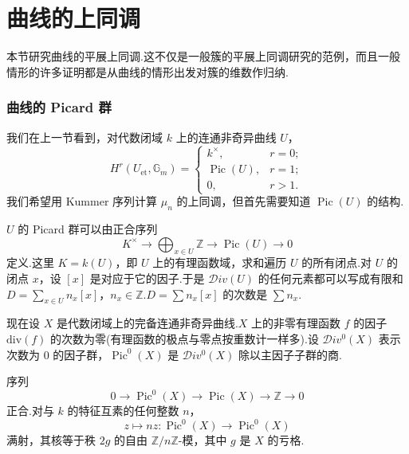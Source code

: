 ﻿%
\chapter{曲线的上同调}\label{sec:14}

本节研究曲线的平展上同调.这不仅是一般簇的平展上同调研究的范例，而且一般情形的许多证明都是从曲线的情形出发对簇的维数作归纳.

\subsection*{曲线的 Picard 群}

我们在上一节看到，对代数闭域 $k$ 上的连通非奇异曲线 $U$，
\[
H^{r}(U_{\mathrm{et}}, \mathbb{G}_{m}) = \begin{cases}
k^{\times}, & r = 0;\\
\operatorname{Pic}(U), & r = 1;\\
0, & r > 1.
\end{cases}
\]
我们希望用 Kummer 序列计算 $\mu_n$ 的上同调，但首先需要知道 $\operatorname{Pic}(U)$ 的结构.

$U$ 的 Picard 群可以由正合序列
\[
K^{\times} \to \bigoplus_{x \in U} \mathbb{Z} \to \operatorname{Pic}(U) \to 0
\]
定义.这里 $K = k(U)$，即 $U$ 上的有理函数域，求和遍历 $U$ 的所有闭点.对 $U$ 的闭点 $x$，设 $[x]$ 是对应于它的因子.于是 $\mathcal{D}iv(U)$ 的任何元素都可以写成有限和 $D = \sum_{x \in U} n_x [x]$，$n_x \in \mathbb{Z}$.$D = \sum n_x [x]$ 的次数是 $\sum n_x$.

现在设 $X$ 是代数闭域上的完备连通非奇异曲线.$X$ 上的非零有理函数 $f$ 的因子 $\mathrm{div}(f)$ 的次数为零(有理函数的极点与零点按重数计一样多).设 $\mathcal{D}iv^{0}(X)$ 表示次数为 0 的因子群，$\operatorname{Pic}^{0}(X)$ 是 $\mathcal{D}iv^{0}(X)$ 除以主因子子群的商.

\begin{proposition}\label{prop:14.1}
序列
\[
0 \to \operatorname{Pic}^{0}(X) \to \operatorname{Pic}(X) \to \mathbb{Z} \to 0
\]
正合.对与 $k$ 的特征互素的任何整数 $n$，
\[
z \mapsto nz \colon \operatorname{Pic}^{0}(X) \to \operatorname{Pic}^{0}(X)
\]
满射，其核等于秩 $2g$ 的自由 $\mathbb{Z}/n\mathbb{Z}$-模，其中 $g$ 是 $X$ 的亏格.
\end{proposition}

